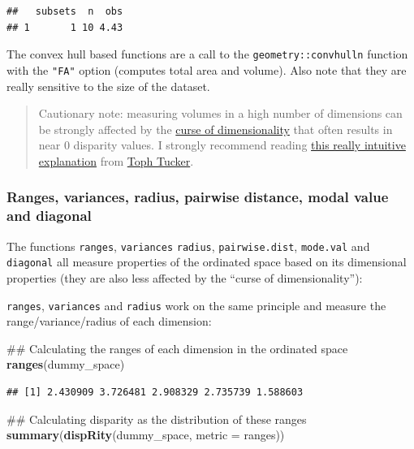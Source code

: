 \documentclass[]{book}
\newenvironment{Shaded}{\begin{snugshade}}{\end{snugshade}}
\newcommand{\KeywordTok}[1]{\textcolor[rgb]{0.13,0.29,0.53}{\textbf{#1}}}
\newcommand{\DataTypeTok}[1]{\textcolor[rgb]{0.13,0.29,0.53}{#1}}
\newcommand{\NormalTok}[1]{#1}
\theoremstyle{definition}
\theoremstyle{definition}
\theoremstyle{definition}
\theoremstyle{remark}
\begin{document}
\begin{verbatim}
##   subsets  n  obs
## 1       1 10 4.43
\end{verbatim}

The convex hull based functions are a call to the
\texttt{geometry::convhulln} function with the \texttt{"FA"} option
(computes total area and volume). Also note that they are really
sensitive to the size of the dataset.

\begin{quote}
Cautionary note: measuring volumes in a high number of dimensions can be
strongly affected by the
\href{https://en.wikipedia.org/wiki/Curse_of_dimensionality}{curse of
dimensionality} that often results in near 0 disparity values. I
strongly recommend reading
\href{https://beta.observablehq.com/@tophtucker/theres-plenty-of-room-in-the-corners}{this
really intuitive explanation} from
\href{https://github.com/tophtucker}{Toph Tucker}.
\end{quote}

\subsubsection{Ranges, variances, radius, pairwise distance, modal value
and
diagonal}\label{ranges-variances-radius-pairwise-distance-modal-value-and-diagonal}

The functions \texttt{ranges}, \texttt{variances} \texttt{radius},
\texttt{pairwise.dist}, \texttt{mode.val} and \texttt{diagonal} all
measure properties of the ordinated space based on its dimensional
properties (they are also less affected by the ``curse of
dimensionality''):

\texttt{ranges}, \texttt{variances} and \texttt{radius} work on the same
principle and measure the range/variance/radius of each dimension:

\begin{Shaded}
\begin{Highlighting}[]
\NormalTok{## Calculating the ranges of each dimension in the ordinated space}
\KeywordTok{ranges}\NormalTok{(dummy_space)}
\end{Highlighting}
\end{Shaded}

\begin{verbatim}
## [1] 2.430909 3.726481 2.908329 2.735739 1.588603
\end{verbatim}

\begin{Shaded}
\begin{Highlighting}[]
\NormalTok{## Calculating disparity as the distribution of these ranges}
\KeywordTok{summary}\NormalTok{(}\KeywordTok{dispRity}\NormalTok{(dummy_space, }\DataTypeTok{metric =}\NormalTok{ ranges))}
\end{Highlighting}
\end{Shaded}
\end{document}
